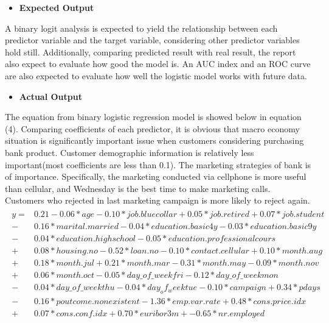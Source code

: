        \begin{itemize}
       	\item \textbf{Expected Output}
       \end{itemize}
   A binary logit analysis is expected to yield the relationship between each predictor variable and the target variable, considering other predictor variables hold still. Additionally, comparing predicted result with real result, the report also expect to evaluate how good the model is. An AUC index and an ROC curve are also expected to evaluate how well the logistic model works with future data.
\begin{itemize}
	\item \textbf{Actual Output}
\end{itemize}
  \noindent The equation from binary logistic regression model is showed below in equation (4). Comparing coefficients of each predictor, it is obvious that macro economy situation is significantly important issue when customers considering purchasing bank product. Customer demographic information is relatively less important(most coefficients are less than 0.1). The marketing strategies of bank is of importance. Specifically, the marketing conducted via cellphone is more useful than cellular, and Wednesday is the best time to make marketing calls. Customers who rejected in last marketing campaign is more likely to reject again. \\
  \begin{eqnarray}\label{}
  \begin{split}
  y =& 0.21-0.06\ast{age}-0.10\ast{job.bluecollar}+0.05\ast{job.retired}+0.07\ast{job.student}\\
  - &0.16\ast{marital.married}-0.04\ast{education.basic4y}-0.03\ast{education.basic9y}\\
  - &0.04\ast{education.highschool}-0.05\ast{education.professionalcours}\\
  + &0.08\ast{housing.no}-0.52\ast{loan.no}-0.10\ast{contact.cellular}+0.10\ast{month.aug}\\
  + &0.18\ast{month.jul}+0.21\ast{month.mar}-0.31\ast{month.may}-0.09\ast{month.nov}\\
  + &0.06\ast{month.oct}-0.05\ast{day\_of\_weekfri}-0.12\ast{day\_of\_weekmon}\\
  - &0.04\ast{day\_of\_weekthu}-0.04\ast{day_of_weektue}-0.10\ast{campaign}+0.34\ast{pdays}\\
  - &0.16\ast{poutcome.nonexistent}-1.36\ast{emp.var.rate}+ 0.48\ast{cons.price.idx} \\
  + &0.07\ast{cons.conf.idx}+0.70\ast{euribor3m}+-0.65\ast{nr.employed}
  \end{split}
  \end{eqnarray}
